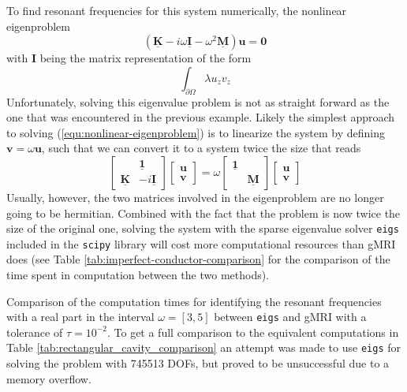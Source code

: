 \documentclass[11pt, a4paper]{article}
\begin{document}
To find resonant frequencies for this system numerically, the nonlinear eigenproblem
\begin{equation}
    (\mathbf{\underline{K}} - i \omega \mathbf{\underline{I}} - \omega^2 \mathbf{\underline{M}}) \mathbf{u} = \mathbf{0} \label{equ:nonlinear-eigenproblem}
\end{equation}
with $\mathbf{I}$ being the matrix representation of the form
\begin{equation}
    \int_{\partial \Omega} \lambda u_z v_z 
\end{equation}
Unfortunately, solving this eigenvalue problem is not as straight forward as the
one that was encountered in the previous example. Likely the simplest approach
to solving (\ref{equ:nonlinear-eigenproblem}) is to linearize the system by
defining $\mathbf{v} = \omega \mathbf{u}$, such that we can convert it to a
system twice the size that reads
\begin{equation}
    \begin{bmatrix}
         & \boldsymbol{\underline{1}} \\
        \mathbf{\underline{K}} & -i \mathbf{\underline{I}}
    \end{bmatrix}
    \begin{bmatrix}
        \mathbf{u} \\
        \mathbf{v}
    \end{bmatrix}
    =
    \omega
    \begin{bmatrix}
        \boldsymbol{\underline{1}} & \\
         & \boldsymbol{\underline{M}}
    \end{bmatrix}
    \begin{bmatrix}
        \mathbf{u} \\
        \mathbf{v}
    \end{bmatrix}
\end{equation}
Usually, however, the two matrices involved in the eigenproblem are no longer
going to be hermitian. Combined with the fact that the problem is now twice
the size of the original one, solving the system with the sparse eigenvalue
solver \texttt{eigs} included in the \texttt{scipy} library will cost more
computational resources than \acrshort{gMRI} does (see Table \ref{tab:imperfect-conductor-comparison}
for the comparison of the time spent in computation between the two methods).

\begin{table}[ht]
    \caption{Comparison of the computation times for identifying the resonant
    frequencies with a real part in the interval $\omega=[3, 5]$ between \texttt{eigs} and
    \acrshort{gMRI} with a tolerance of $\tau = 10^{-2}$. To get a full
    comparison to the equivalent computations in Table \ref{tab:rectangular_cavity_comparison}
    an attempt was made to use \texttt{eigs} for solving the problem with 
    745513 \acrshort{DOF}s, but proved to be unsuccessful due to a memory overflow.}
    \label{tab:imperfect-conductor-comparison}
    
\end{table}
\end{document}
